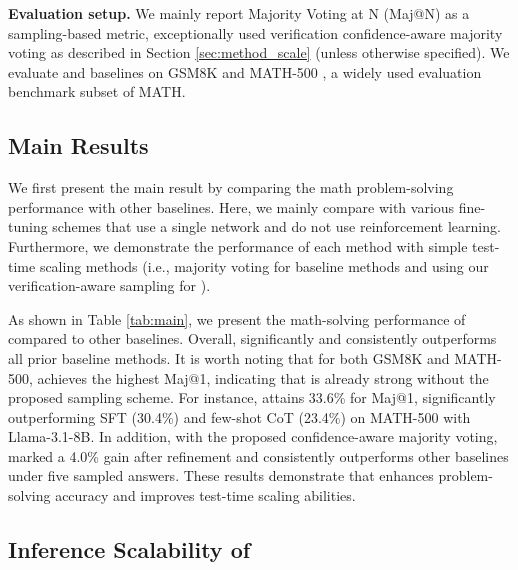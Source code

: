 \textbf{Evaluation setup.} We mainly report Majority Voting at N (Maj@N) as a sampling-based metric, exceptionally \sname used verification confidence-aware majority voting as described in Section \ref{sec:method_scale} (unless otherwise specified). We evaluate \sname and baselines on GSM8K \citep{cobbe2021gsm8k} and MATH-500 \citep{hendrycks2021math}, a widely used evaluation benchmark subset of MATH.

\subsection{Main Results}




We first present the main result by comparing the math problem-solving performance with other baselines. Here, we mainly compare \sname with various fine-tuning schemes that use a single network and do not use reinforcement learning. Furthermore, we demonstrate the performance of each method with simple test-time scaling methods (i.e., majority voting for baseline methods and using our verification-aware sampling for \sname). 

As shown in Table \ref{tab:main}, we present the math-solving performance of \sname compared to other baselines. Overall, \sname significantly and consistently outperforms all prior baseline methods. It is worth noting that for both GSM8K and MATH-500, \sname achieves the highest Maj@1, indicating that \sname is already strong without the proposed sampling scheme. For instance, \sname attains 33.6\% for Maj@1, significantly outperforming SFT (30.4\%) and few-shot CoT (23.4\%) on MATH-500 with Llama-3.1-8B. In addition, with the proposed confidence-aware majority voting, \sname marked a 4.0\% gain after refinement and consistently outperforms other baselines under five sampled answers. These results demonstrate that \sname enhances problem-solving accuracy and improves test-time scaling abilities.


\subsection{Inference Scalability of \sname} 

